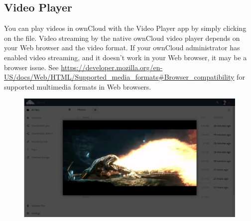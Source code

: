 \documentclass[letterpaper,10pt,english]{sphinxmanual}
\begin{document}
\subsection{Video Player}
\label{files/access_webgui:video-player}
You can play videos in ownCloud with the Video Player app by simply clicking on
the file. Video streaming by the native ownCloud video player depends on your Web browser
and the video format. If your ownCloud administrator has enabled video
streaming, and it doesn't work in your Web browser, it may be a browser issue. See \href{https://developer.mozilla.org/en-US/docs/Web/HTML/Supported\_media\_formats\#Browser\_compatibility}{https://developer.mozilla.org/en-US/docs/Web/HTML/Supported\_media\_formats\#Browser\_compatibility} for supported multimedia formats in Web browsers.
\begin{figure}[htbp]
\centering

\includegraphics{video_player_2.png}
\end{figure}
\end{document}
